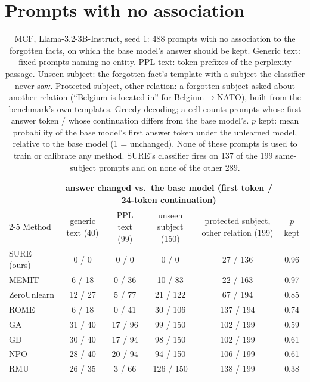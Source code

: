 \documentclass{article}
\theoremstyle{remark}
\theoremstyle{definition}
\begin{document}
\section{Prompts with no association}
\label{app:noassoc}

\begin{table}[h]
\centering
\small
\setlength{\tabcolsep}{3pt}
\begin{tabular}{l cccc c}
\toprule
& \multicolumn{4}{c}{answer changed vs.\ the base model (first token / 24-token continuation)} & \\
\cmidrule(lr){2-5}
Method & generic text (40) & PPL text (99) & unseen subject (150) & protected subject, other relation (199) & $p$ kept \\
\midrule
SURE (ours) & 0 / 0 & 0 / 0 & 0 / 0 & 27 / 136 & 0.96 \\
MEMIT       & 6 / 18 & 0 / 36 & 10 / 83 & 22 / 163 & 0.97 \\
ZeroUnlearn & 12 / 27 & 5 / 77 & 21 / 122 & 67 / 194 & 0.85 \\
ROME        & 6 / 18 & 0 / 41 & 30 / 106 & 137 / 194 & 0.74 \\
GA          & 31 / 40 & 17 / 96 & 99 / 150 & 102 / 199 & 0.59 \\
GD          & 30 / 40 & 17 / 94 & 98 / 150 & 102 / 199 & 0.61 \\
NPO         & 28 / 40 & 20 / 94 & 94 / 150 & 106 / 199 & 0.61 \\
RMU         & 26 / 35 & 3 / 66 & 126 / 150 & 138 / 199 & 0.38 \\
\bottomrule
\end{tabular}
\caption{MCF, Llama-3.2-3B-Instruct, seed 1: 488 prompts with no association to the forgotten facts, on which the base model's answer should be kept. Generic text: fixed prompts naming no entity. PPL text: token prefixes of the perplexity passage. Unseen subject: the forgotten fact's template with a subject the classifier never saw. Protected subject, other relation: a forgotten subject asked about another relation (``Belgium is located in'' for Belgium$\to$NATO), built from the benchmark's own templates. Greedy decoding; a cell counts prompts whose first answer token / whose continuation differs from the base model's. $p$ kept: mean probability of the base model's first answer token under the unlearned model, relative to the base model (1 = unchanged). None of these prompts is used to train or calibrate any method. SURE's classifier fires on 137 of the 199 same-subject prompts and on none of the other 289.}
\label{tab:noassoc}
\end{table}
\end{document}
